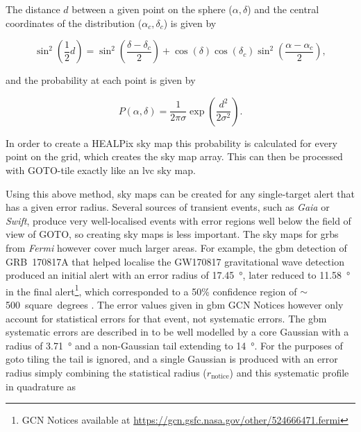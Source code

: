 \begin{colsection}
\begin{colsection}
The distance $d$ between a given point on the sphere ($\alpha, \delta$) and the central coordinates of the distribution ($\alpha_c, \delta_c$) is given by

\begin{equation}
    \sin^2 \left ( \frac{1}{2} d \right )
    = \sin^2 \left ( \frac{\delta-\delta_c}{2} \right)
      + \cos (\delta) \cos (\delta_c) \sin^2 \left ( \frac{\alpha-\alpha_c}{2} \right),
    \label{eq:gaussian_distance}
\end{equation}

and the probability at each point is given by

\begin{equation}
    P(\alpha, \delta) = \frac{1}{2\pi\sigma} \exp \left ( \frac{d^2}{2\sigma^2} \right ).
    \label{eq:gaussian_prob}
\end{equation}

In order to create a HEALPix sky map this probability is calculated for every point on the grid, which creates the sky map array. This can then be processed with GOTO-tile exactly like an \gls{lvc} sky map.

Using this above method, sky maps can be created for any single-target alert that has a given error radius. Several sources of transient events, such as \textit{Gaia} or \textit{Swift}, produce very well-localised events with error regions well below the field of view of GOTO, so creating sky maps is less important. The sky maps for \glspl{grb} from \textit{Fermi} however cover much larger areas. For example, the \gls{gbm} detection of GRB~170817A that helped localise the GW170817 gravitational wave detection produced an initial alert with an error radius of \SI{17.45}{\degree}, later reduced to \SI{11.58}{\degree} in the final alert\footnote{GCN Notices available at \url{https://gcn.gsfc.nasa.gov/other/524666471.fermi}}, which corresponded to a 50\% confidence region of $\sim$500~square~degrees \citep{GW170817_Fermi}. The error values given in \gls{gbm} GCN Notices however only account for statistical errors for that event, not systematic errors. The \gls{gbm} systematic errors are described in \citet{Fermi_localisation} to be well modelled by a core Gaussian with a radius of \SI{3.71}{\degree} and a non-Gaussian tail extending to \SI{14}{\degree}. For the purposes of \gls{goto} tiling the tail is ignored, and a single Gaussian is produced with an error radius simply combining the statistical radius ($r_\text{notice}$) and this  systematic profile in quadrature as


\end{colsection}
\end{colsection}
